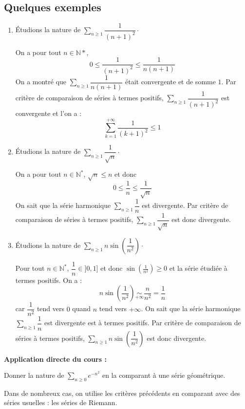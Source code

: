 \documentclass[french,11pt,twoside]{VcCours}
\newenvironment{ApplicationDirecte}{\textbf{Application directe du cours :}

}{}
\newcommand{\Sum}[2]{\ensuremath{\textstyle{\sum\limits_{#1}^{#2}}}}
\begin{document}
\subsection{Quelques exemples}


\begin{Exemples}
\begin{enumerate}
	\item Étudions la nature de $\Sum{n \geq 1}{} \dfrac{1}{(n+1)^2}\cdot$


On a pour tout $n \in \mathbb{N}*$, 
$$ 0 \leq \frac{1}{(n+1)^2} \leq \frac{1}{n(n+1)} $$
On a montré que $\Sum{n\geq 1}{} \dfrac{1}{n(n+1)}$ était convergente et de somme $1$. Par critère de comparaison de séries à termes positifs, $\Sum{n\geq 1}{} \dfrac{1}{(n+1)^2}$ est convergente et l'on a :
$$ \sum_{k=1}^{+ \infty} \frac{1}{(k+1)^2} \leq 1$$
\item Étudions la nature de $\Sum{n \geq 1}{} \dfrac{1}{\sqrt{n}} \cdot$



On a pour tout $n \in \mathbb{N}^*$, $\sqrt{n} \leq n$ et donc 
$$ 0 \leq \frac{1}{n} \leq \frac{1}{\sqrt{n}}$$
On sait que la série harmonique $\Sum{n\geq 1}{} \dfrac{1}{n}$ est divergente. Par critère de comparaison de séries à termes positifs, $\Sum{n\geq 1}{}\dfrac{1}{\sqrt{n}}$ est donc divergente.
\item Étudions la nature de $\Sum{n \geq 1}{} n \sin \left(\dfrac{1}{n^2}\right) \cdot$



Pour tout $n \in \mathbb{N}^*$, $\dfrac{1}{n} \in ]0,1]$ et donc $\sin \left(\frac{1}{n^2}\right) \geq 0$ et la série étudiée à termes positifs. On a :
$$ n \sin \left(\frac{1}{n^2}\right) \underset{+ \infty}{\sim} \frac{n}{n^2} = \frac{1}{n}$$
car $\dfrac{1}{n^2}$ tend vers $0$ quand $n$ tend vers $+ \infty$. On sait que la série harmonique $\Sum{n\geq 1}{} \dfrac{1}{n}$ est divergente est à termes positifs. Par critère de comparaison de séries à termes positifs, $\Sum{n\geq 1}{} n \sin \left(\dfrac{1}{n^2}\right) $ est donc divergente.
\end{enumerate}
\end{Exemples}

\begin{ApplicationDirecte} Donner la nature de $ \Sum{n \geq 0}{}  e^{-n^2}$ en la comparant à une série géométrique.
\end{ApplicationDirecte}

Dans de nombreux cas, on utilise les critères précédents en comparant avec des séries usuelles : les séries de Riemann.
\end{document}
